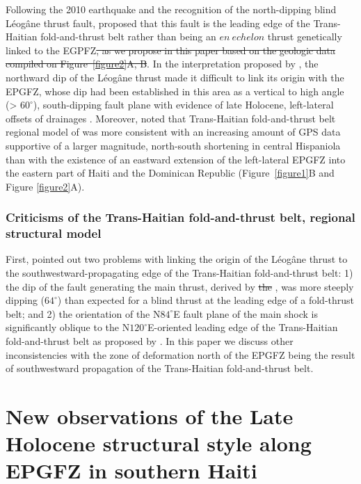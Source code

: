 \documentclass[linenumbers,draft]{agujournal}
\begin{document}
Following the 2010 earthquake and the recognition of the north-dipping blind L\'eog\^ane thrust fault, \citet{calais2010transpressional} proposed that this fault is the leading edge of the Trans-Haitian fold-and-thrust belt rather than being an $en~echelon$ thrust genetically linked to the EGPFZ\st{, as we propose in this paper based on the geologic data compiled on Figure~{\ref{figure2}}A, B}. In the interpretation proposed by \citet{calais2010transpressional}, the northward dip of the L\'eog\^ane thrust made it difficult to link its origin with the EPGFZ, whose dip had been established in this area as a vertical to high angle (> $60^{\circ}$), south-dipping fault plane with evidence of late Holocene, left-lateral offsets of drainages \citep{prentice2010seismic}. Moreover, \citet{symithe2016present} noted that Trans-Haitian fold-and-thrust belt regional model of \citet{pubellier2000plate} was more consistent with an increasing amount of GPS data supportive of a larger magnitude, north-south shortening in central Hispaniola than with the existence of an eastward extension of the left-lateral EPGFZ into the eastern part of Haiti and the Dominican Republic (Figure~\ref{figure1}B and Figure \ref{figure2}A).

\subsubsection{Criticisms of the Trans-Haitian fold-and-thrust belt, regional structural model}
First, \citet{mercier20112010} pointed out two problems with linking the origin of the L\'eog\^ane thrust to the southwestward-propagating edge of the Trans-Haitian fold-and-thrust belt: 1) the dip of the fault generating the main thrust, derived by \st{the} \citet{mercier20112010}, was more steeply dipping ($64^{\circ}$) than expected for a blind thrust at the leading edge of a fold-thrust belt; and 2) the orientation of the N$84^{\circ}$E fault plane of the main shock is significantly oblique to the N$120^{\circ}$E-oriented leading edge of the Trans-Haitian fold-and-thrust belt as proposed by \citet{pubellier2000plate}. In this paper we discuss other inconsistencies with the zone of deformation north of the EPGFZ being the result of southwestward propagation of the Trans-Haitian fold-and-thrust belt.

\section{New observations of the Late Holocene structural style along EPGFZ in southern Haiti}
\end{document}
